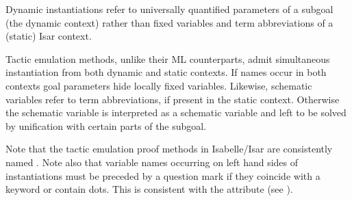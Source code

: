 \begin{isabellebody}
\begin{isamarkuptext}
  \begin{warn}
    Dynamic instantiations refer to universally quantified parameters
    of a subgoal (the dynamic context) rather than fixed variables and
    term abbreviations of a (static) Isar context.
  \end{warn}

  Tactic emulation methods, unlike their ML counterparts, admit
  simultaneous instantiation from both dynamic and static contexts.
  If names occur in both contexts goal parameters hide locally fixed
  variables.  Likewise, schematic variables refer to term
  abbreviations, if present in the static context.  Otherwise the
  schematic variable is interpreted as a schematic variable and left
  to be solved by unification with certain parts of the subgoal.

  Note that the tactic emulation proof methods in Isabelle/Isar are
  consistently named .  Note also that variable names
  occurring on left hand sides of instantiations must be preceded by a
  question mark if they coincide with a keyword or contain dots.  This
  is consistent with the attribute \hyperlink{attribute.where}{\mbox{}} (see
  ).


\end{isamarkuptext}
\end{isabellebody}
